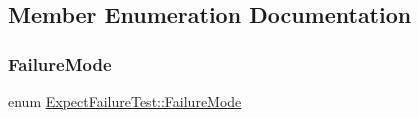 \subsection{Member Enumeration Documentation}
\mbox{\label{class_expect_failure_test_aad05da10bb15d21a434eba3b37011406}} 
\subsubsection{\texorpdfstring{FailureMode}{FailureMode}\hspace{0.1cm}{\footnotesize\ttfamily [1/3]}}
{\footnotesize\ttfamily enum \mbox{\hyperlink{class_expect_failure_test_aad05da10bb15d21a434eba3b37011406}{Expect\+Failure\+Test\+::\+Failure\+Mode}}}

